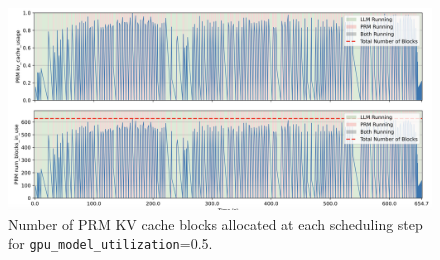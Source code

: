 \documentclass[11pt,twoside]{report}
\begin{document}
\begin{figure}[htbp]
  \centering
  \includegraphics[width=\textwidth]{figures/prm_block_usage_high.png}
  \caption{Number of PRM KV cache blocks allocated at each scheduling step for \texttt{gpu\_model\_utilization}=0.5.}
  \label{fig:prm_block_usage_high}
\end{figure}
\end{document}
